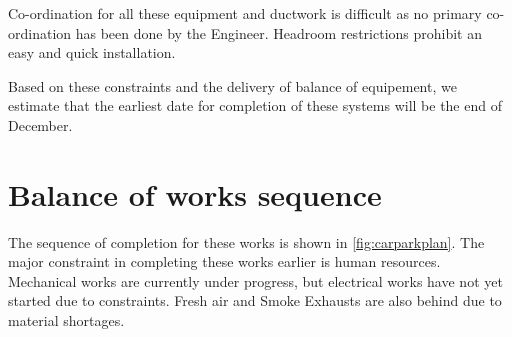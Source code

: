 Co-ordination for all these equipment and ductwork is difficult as no primary co-ordination has been done by the Engineer. Headroom restrictions prohibit an easy and quick installation.

Based on these constraints and the delivery of balance of equipement, we estimate that the earliest date for completion of these systems will be the end of December. 

\section{Balance of works sequence}

The sequence of completion for these works is shown in \ref{fig:carparkplan}. The major constraint in completing these works earlier is human resources. Mechanical works are currently under progress, but electrical works have not yet started due to constraints. Fresh air and Smoke Exhausts are also behind due to material shortages. 



